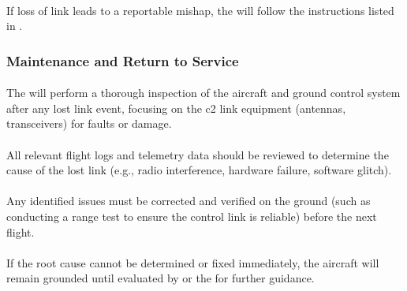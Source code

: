                 \paragraph{} If loss of link leads to a reportable mishap, the  will follow the instructions listed in .
       
            \subsubsection{Maintenance and Return to Service}
                            
                \paragraph{} The  will perform a thorough inspection of the aircraft and ground control system after any lost link event, focusing on the \ac{c2} link equipment (antennas, transceivers) for faults or damage.
                
                \paragraph{} All relevant flight logs and telemetry data should be reviewed to determine the cause of the lost link (e.g., radio interference, hardware failure, software glitch).
                
                \paragraph{} Any identified issues must be corrected and verified on the ground (such as conducting a range test to ensure the control link is reliable) before the next flight.
                
                \paragraph{} If the root cause cannot be determined or fixed immediately, the aircraft will remain grounded until evaluated by  or the  for further guidance.
                
            
